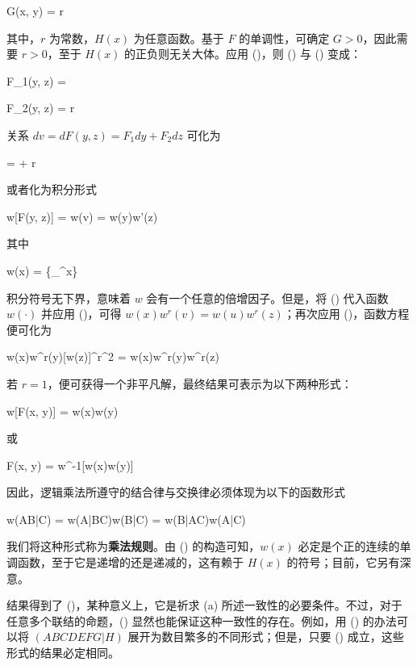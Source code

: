 \startformula
G(x, y) = r
\stopformula

其中，$r$ 为常数，$H(x)$ 为任意函数。基于 $F$ 的单调性，可确定 $G > 0$，因此需要 $r > 0$，至于 $H(x)$ 的正负则无关大体。应用 ()，则 (\in[eq-U]) 与 (\in[eq-V]) 变成：

\placeformula
\startformula
F_1(y, z) =  
\stopformula

\placeformula
\startformula
F_2(y, z) = r 
\stopformula

关系 $dv=dF(y, z)=F_1dy + F_2dz$ 可化为

\placeformula
\startformula
{} =  + r
\stopformula

或者化为积分形式

\placeformula[eq-int]
\startformula
w[F(y, z)] = w(v) = w(y)w'(z)
\stopformula

其中

\placeformula[w-func]
\startformula
w(x) = \left\{\int_{}^{x}\right\}
\stopformula

积分符号无下界，意味着 $w$ 会有一个任意的倍增因子。但是，将 (\in[eq-target]) 代入函数 $w(\cdot)$ 并应用 (\in[eq-int])，可得 $w(x)w^r(v) = w(u)w^r(z)$；再次应用 (\in[eq-int])，函数方程便可化为

\placeformula[2-25]
\startformula
w(x)w^r(y)[w(z)]^{r^2} = w(x)w^r(y)w^r(z)
\stopformula

若 $r = 1$，便可获得一个非平凡解，最终结果可表示为以下两种形式：

\placeformula
\startformula
w[F(x, y)] = w(x)w(y)
\stopformula

或

\startformula
F(x, y) = w^{-1}[w(x)w(y)]
\stopformula

因此，逻辑乘法所遵守的结合律与交换律必须体现为以下的函数形式

\startformula
w(AB|C) = w(A|BC)w(B|C) = w(B|AC)w(A|C)
\stopformula

我们将这种形式称为{\bf 乘法规则}。由 (\in[w-func]) 的构造可知，$w(x)$ 必定是个正的连续的单调函数，至于它是递增的还是递减的，这有赖于 $H(x)$ 的符号；目前，它另有深意。

结果得到了 ()，某种意义上，它是祈求 (a) 所述一致性的必要条件。不过，对于任意多个联结的命题，() 显然也能保证这种一致性的存在。例如，用 () 的办法可以将 $(ABCDEFG|H)$ 展开为数目繁多的不同形式；但是，只要 () 成立，这些形式的结果必定相同。

